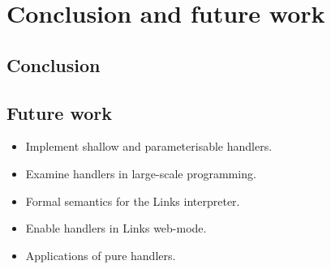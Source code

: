 \chapter{Conclusion and future work}
\section{Conclusion}
\section{Future work}
\begin{itemize}
  \item Implement shallow and parameterisable handlers.
  \item Examine handlers in large-scale programming.
  \item Formal semantics for the Links interpreter.
  \item Enable handlers in Links web-mode.
  \item Applications of pure handlers.
\end{itemize}